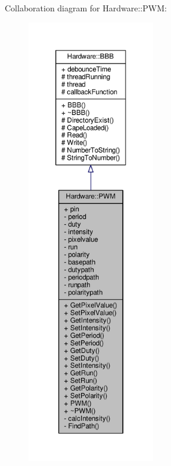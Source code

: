 Collaboration diagram for Hardware\+:\+:P\+W\+M\+:\nopagebreak
\begin{figure}[H]
\begin{center}
\leavevmode
\includegraphics[height=550pt]{class_hardware_1_1_p_w_m__coll__graph}
\end{center}
\end{figure}
